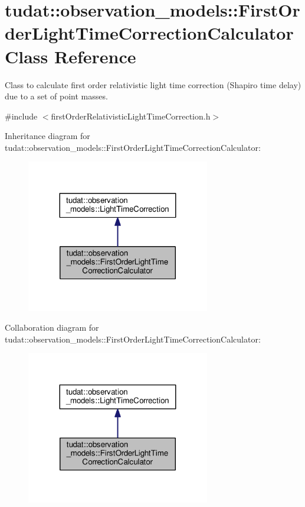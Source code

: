 \hypertarget{classtudat_1_1observation__models_1_1FirstOrderLightTimeCorrectionCalculator}{}\section{tudat\+:\+:observation\+\_\+models\+:\+:First\+Order\+Light\+Time\+Correction\+Calculator Class Reference}
\label{classtudat_1_1observation__models_1_1FirstOrderLightTimeCorrectionCalculator}


Class to calculate first order relativistic light time correction (Shapiro time delay) due to a set of point masses.  




{\ttfamily \#include $<$first\+Order\+Relativistic\+Light\+Time\+Correction.\+h$>$}



Inheritance diagram for tudat\+:\+:observation\+\_\+models\+:\+:First\+Order\+Light\+Time\+Correction\+Calculator\+:
\nopagebreak
\begin{figure}[H]
\begin{center}
\leavevmode
\includegraphics[width=227pt]{classtudat_1_1observation__models_1_1FirstOrderLightTimeCorrectionCalculator__inherit__graph}
\end{center}
\end{figure}


Collaboration diagram for tudat\+:\+:observation\+\_\+models\+:\+:First\+Order\+Light\+Time\+Correction\+Calculator\+:
\nopagebreak
\begin{figure}[H]
\begin{center}
\leavevmode
\includegraphics[width=227pt]{classtudat_1_1observation__models_1_1FirstOrderLightTimeCorrectionCalculator__coll__graph}
\end{center}
\end{figure}
